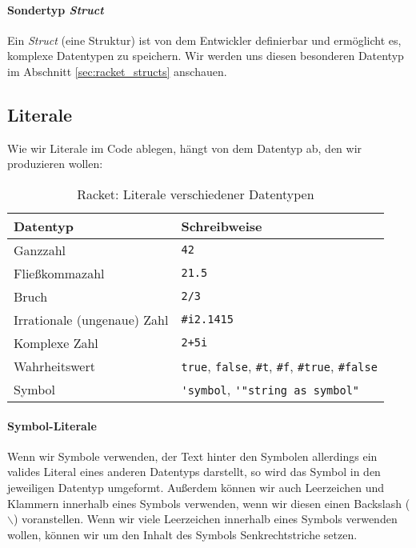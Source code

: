 	\paragraph{Sondertyp \textit{Struct}}
		Ein \textit{Struct} (eine Struktur) ist von dem Entwickler definierbar und ermöglicht es, komplexe Datentypen zu speichern. Wir werden uns diesen besonderen Datentyp im Abschnitt \ref{sec:racket_structs} anschauen.

\subsection{Literale}
	
	Wie wir Literale im Code ablegen, hängt von dem Datentyp ab, den wir produzieren wollen:
	
	\begin{table}[H]
		\centering
		\begin{tabular}{l | l}
			\textbf{Datentyp} & \textbf{Schreibweise} \\ \hline
			Ganzzahl & \lstinline[language = Racket]|42| \\
			Fließkommazahl & \lstinline[language = Racket]|21.5| \\
			Bruch & \lstinline[language = Racket]|2/3| \\
			Irrationale (ungenaue) Zahl & \lstinline[language = Racket]|#i2.1415| \\
			Komplexe Zahl & \lstinline[language = Racket]|2+5i| \\
			Wahrheitswert & \lstinline[language = Racket]|true|, \lstinline[language = Racket]|false|, \lstinline[language = Racket]|#t|, \lstinline[language = Racket]|#f|, \lstinline[language = Racket]|#true|, \lstinline[language = Racket]|#false| \\
			Symbol & \lstinline[language = Racket]|'symbol|, \lstinline[language = Racket]|'"string as symbol"| \\
		\end{tabular}
		\caption{Racket: Literale verschiedener Datentypen}
	\end{table}

	\paragraph{Symbol-Literale}
		Wenn wir Symbole verwenden, der Text hinter den Symbolen allerdings ein valides Literal eines anderen Datentyps darstellt, so wird das Symbol in den jeweiligen Datentyp umgeformt. Außerdem können wir auch Leerzeichen und Klammern innerhalb eines Symbols verwenden, wenn wir diesen einen Backslash (\(\backslash\)) voranstellen. Wenn wir viele Leerzeichen innerhalb eines Symbols verwenden wollen, können wir um den Inhalt des Symbols Senkrechtstriche setzen.
		
